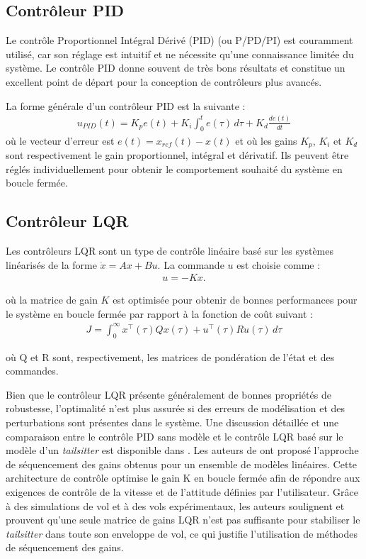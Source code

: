 \subsection*{Contrôleur PID}
Le contrôle Proportionnel Intégral Dérivé (PID) (ou P/PD/PI) est couramment utilisé, car son réglage est intuitif et ne nécessite qu'une connaissance limitée du système. Le contrôle PID donne souvent de très bons résultats et constitue un excellent point de départ pour la conception de contrôleurs plus avancés.

La forme générale d'un contrôleur PID est la suivante :
\begin{align}
    u_{PID}(t) = K_{p} e(t) + K_{i} \int_{0}^{t} e(\tau) \,d\tau + K_{d} \frac{d e(t)}{dt}
\end{align}
{\color{red} où le vecteur d'erreur est $e(t) = x_{ref} (t) - x(t)$ et où les gains $K_{p}$, $K_{i}$ et $K_{d}$ sont respectivement le gain proportionnel, intégral et dérivatif. Ils peuvent être réglés individuellement pour obtenir le comportement souhaité du système en boucle fermée.}

\subsection*{Contrôleur LQR}
Les contrôleurs LQR sont un type de contrôle linéaire basé sur les systèmes linéarisés de la forme $\dot{x} = Ax+Bu$. La commande $u$ est
choisie comme :
\begin{align*}
    u = -Kx.
\end{align*}

où la matrice de gain $K$ est optimisée pour obtenir de bonnes performances pour le système en boucle fermée par rapport à la fonction de coût suivant :
\begin{align*}
    J = \int_{0}^{\infty} x^{\top}(\tau)Q x(\tau) + u^{\top}(\tau)R u(\tau) \,d\tau
\end{align*}

où Q et R sont, respectivement, les matrices de pondération de l'état et des commandes. 

Bien que le contrôleur LQR présente généralement de bonnes propriétés de robustesse, l'optimalité n'est plus assurée si des erreurs de modélisation et des perturbations sont présentes dans le système. Une discussion détaillée et une comparaison entre le contrôle PID sans modèle et le contrôle LQR basé sur le modèle d'un \textit{tailsitter} est disponible dans \cite{BarthCondomines2018}.
Les auteurs de \cite{Lustosa2017LaP} ont proposé l'approche de séquencement des gains obtenus pour un ensemble de modèles linéaires. Cette architecture de contrôle optimise le gain K en boucle fermée afin de répondre aux exigences de contrôle de la vitesse et de l'attitude définies par l'utilisateur. Grâce à des simulations de vol et à des vols expérimentaux, les auteurs soulignent et prouvent qu'une seule matrice de gains LQR n'est pas suffisante pour stabiliser le \textit{tailsitter} dans toute son enveloppe de vol, ce qui justifie l'utilisation de méthodes de séquencement des gains.

